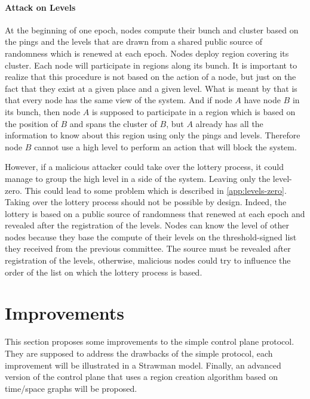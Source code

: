\documentclass[a4paper,11pt,oneside]{report}
\begin{document}
\subsubsection{Attack on Levels} \label{sec:ControlePlane-Threat-Model}
At the beginning of one epoch, nodes compute their bunch and cluster based on
the pings and the levels that are drawn from a shared public source of
randomness which is renewed at each epoch. Nodes deploy region covering its
cluster. Each node will participate in regions along its bunch. It is important
to realize that this procedure is not based on the action of a node, but just
on the fact that they exist at a given place and a given level. What is meant
by that is that every node has the same view of the system. And if node $A$
have node $B$ in its bunch, then node $A$ is supposed to participate in a
region which is based on the position of $B$ and spans the cluster of $B$, but
$A$ already has all the information to know about this region using only the
pings and levels. Therefore node $B$ cannot use a high level to perform an
action that will block the system. 

However, if a malicious attacker could take over the lottery process, it could
manage to group the high level in a side of the system. Leaving only the
level-zero. This could lead to some problem which is described in \autoref{app:levels-zero}.
Taking over the lottery process should not be possible by design. Indeed, the
lottery is based on a public source of randomness that renewed at each epoch
and revealed after the registration of the levels. Nodes can know the level of
other nodes because they base the compute of their levels on the
threshold-signed list they received from the previous committee. The source
must be revealed after registration of the levels, otherwise, malicious nodes
could try to influence the order of the list on which the lottery process is
based. 

\chapter{Improvements} \label{chap:Improvements} %

This section proposes some improvements to the simple control plane protocol. They
are supposed to address the drawbacks of the simple protocol, each improvement
will be illustrated in a Strawman model. Finally, an advanced
version of the control plane that uses a region creation algorithm based on
time/space graphs will be proposed. 
\end{document}
